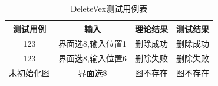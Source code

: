 \documentclass[supercite]{HustGraduPaper}
\theoremstyle{definition}
\begin{document}
\begin{enumerate}
\begin{table}[htb]
\begin{center}
			      \setlength{\tabcolsep}{2.0mm}
			      \caption{DeleteVex测试用例表}
			      \label{t8}
			      \begin{tabular}{|c|c|c|c|}
				      \hline
				      测试用例   & 输入              & 理论结果 & 测试结果 \\
				      \hline
				      \hline
				      123        & 界面选8,输入位置1 & 删除成功 & 删除成功 \\
				      \hline
				      123        & 界面选8,输入位置6 & 删除失败 & 删除失败 \\
				      \hline
				      未初始化图 & 界面选8           & 图不存在 & 图不存在 \\
				      \hline
			      \end{tabular}
		      \end{center}
	      \end{table}
	      \begin{figure}[htb]
		      \centering
		      \quad
		      \quad
		      \\

\end{figure}
\end{enumerate}
\end{document}
